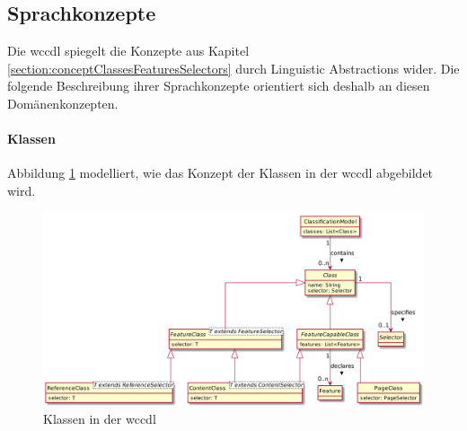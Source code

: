 \subsection{Sprachkonzepte}
    \label{solutionDetails:dslConcepts}
    Die \gls{wccdl} spiegelt die Konzepte aus
    Kapitel \ref{section:conceptClassesFeaturesSelectors}
    durch Linguistic Abstractions wider.
    Die folgende Beschreibung ihrer Sprachkonzepte orientiert sich deshalb an diesen
    Domänenkonzepten.
    
    \paragraph{Klassen}
    Abbildung \ref{image:dslClasses} modelliert,
    wie das Konzept der Klassen in der \gls{wccdl} abgebildet wird.

    \begin{figure}[htb]
        \centering
        \includegraphics[scale=\imageScalingFactor]{../resources/dsl/classes.png}
        \caption{Klassen in der \acrshort{wccdl}}
        \label{image:dslClasses}
    \end{figure}

